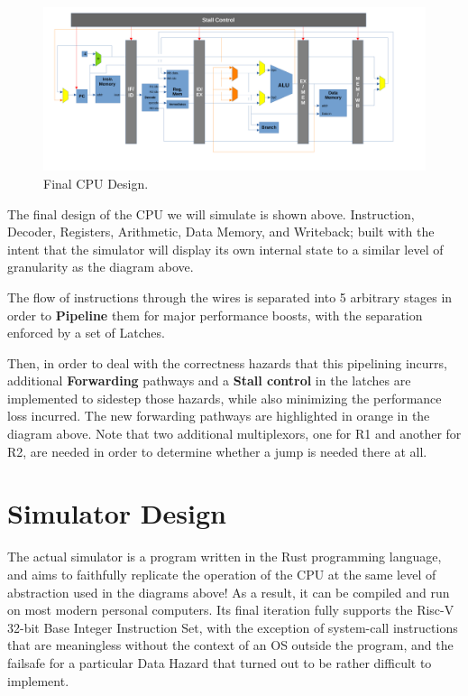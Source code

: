 \documentclass[12pt,twoside]{reedthesis}
\begin{document}
\begin{figure}[h!]

	\centering
	\includegraphics[scale=0.4]{cpu_complete}
	\caption{Final CPU Design.}
	\label{cpu-complete}
\end{figure}

The final design of the CPU we will simulate is shown above. Instruction, Decoder, Registers, Arithmetic, Data Memory, and Writeback; built with the intent that the simulator will display its own internal state to a similar level of granularity as the diagram above.

The flow of instructions through the wires is separated into 5 arbitrary stages in order to \textbf{Pipeline} them for major performance boosts, with the separation enforced by a set of Latches.

Then, in order to deal with the correctness hazards that this pipelining incurrs, additional \textbf{Forwarding} pathways and a \textbf{Stall control} in the latches are implemented to sidestep those hazards, while also minimizing the performance loss incurred.
The new forwarding pathways are highlighted in orange in the diagram above. Note that two additional multiplexors, one for R1 and another for R2, are needed in order to determine whether a jump is needed there at all.

\chapter{Simulator Design}

The actual simulator is a program written in the Rust programming language, and aims to faithfully replicate the operation of the CPU at the same level of abstraction used in the diagrams above!
As a result, it can be compiled and run on most modern personal computers. Its final iteration fully supports the Risc-V 32-bit Base Integer Instruction Set, with the exception of system-call instructions that are meaningless without the context of an OS outside the program, and the failsafe for a particular Data Hazard that turned out to be rather difficult to implement.
\end{document}
